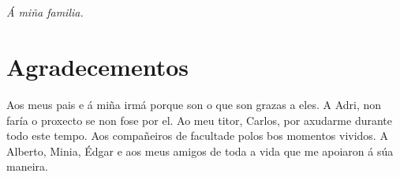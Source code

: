 
\chapter*{ }

\begin{flushright}
\emph{Á miña familia.}
\end{flushright}


\chapter*{Agradecementos}
Aos meus pais e á miña irmá porque son o que son grazas a eles.
A Adri, non faría o proxecto se non fose por el.
Ao meu titor, Carlos, por axudarme durante todo este tempo.
Aos compañeiros de facultade polos bos momentos vividos.
A Alberto, Minia, Édgar e aos meus amigos de toda a vida que me apoiaron á súa maneira.